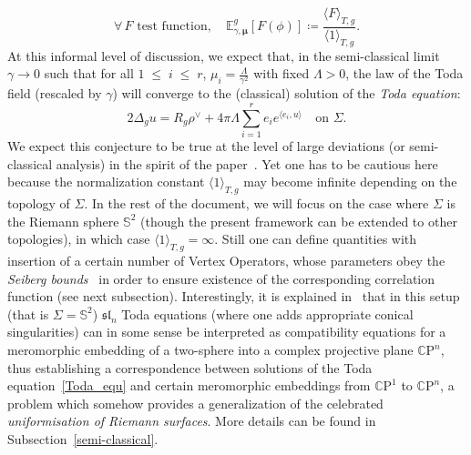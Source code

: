 \documentclass[AHL,Unicode,longabstracts,published]{cedram}
\renewcommand{\leq}{\;\leqslant\;}
\newcommand{\frksl}{\mathfrak{sl}}
\newcommand{\rmP}{\mathrm{P}}
\newcommand{\C}{\mathbb{C}}
\renewcommand*\S{\mathbb{S}}
\newcommand{\E}{\mathbb{E}}
\newcommand{\ps}[1]{\langle #1 \rangle}
\let\oldforall\forall
\renewcommand*{\forall}{\mathrel{\oldforall}}
\begin{document}
\begin{equation}\label{path_integral}
\forall \,F \text{ test function}, \quad \E^g_{\gamma,\bm \mu}[F(\phi)]\coloneqq \frac{ \langle F \rangle_{T,g}}{\langle 1 \rangle_{T,g}}.
\end{equation}
At this informal level of discussion, we expect that, in the semi-classical limit $\gamma\to0$ such that for all $1\leq i\leq r$, $\mu_i= \frac{\Lambda}{\gamma^2}$ with fixed $\Lambda>0$, the law of the Toda field (rescaled by $\gamma$) will converge to the (classical) solution of the \emph{Toda equation}:
\begin{equation}\label{Toda_equ}
2 \Delta_g u = R_g\rho^\vee + 4 \pi \Lambda\sum_{i=1}^{r} e_ie^{\ps{e_i,u}}\quad\text{on }\Sigma.
\end{equation}
We expect this conjecture to be true at the level of large deviations (or semi-classical analysis) in the spirit of the paper~\cite{LRV19}. Yet one has to be cautious here because the normalization constant $\langle 1 \rangle_{T,g}$ may become infinite depending on the topology of $\Sigma$. In the rest of the document, we will focus on the case where $\Sigma$ is the Riemann sphere $\S^2$ (though the present framework can be extended to other topologies), in which case $\langle 1 \rangle_{T,g}=\infty$. Still one can define quantities with insertion of a certain number of Vertex Operators, whose parameters obey the \emph{Seiberg bounds}~\cite{Sei90} in order to ensure existence of the corresponding correlation function (see next subsection). Interestingly, it is explained in~\cite{GeMa92} that in this setup (that is $\Sigma=\S^2$) $\frksl_n$ Toda equations (where one adds appropriate conical singularities) can in some sense be interpreted as compatibility equations for a meromorphic embedding of a two-sphere into a complex projective plane $\C\rmP^n$, thus establishing a correspondence between solutions of the Toda equation~\eqref{Toda_equ} and certain meromorphic embeddings from $\C\rmP^1$ to $\C\rmP^n$, a problem which somehow provides a generalization of the celebrated \emph{uniformisation of Riemann surfaces}. More details can be found in Subsection~\ref{semi-classical}.
\end{document}
